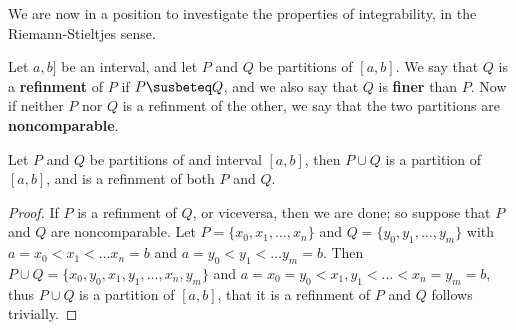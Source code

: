 We are now in a position to investigate the properties of integrability, in the
Riemann-Stieltjes sense.

\begin{definition}
    Let $a,b]$ be an interval, and let  $P$ and  $Q$ be partitions of  $[a,b]$.
    We say that  $Q$ is a \textbf{refinment} of $P$ if  $P \susbeteq Q$, and we
    also say that $Q$ is \textbf{finer} than  $P$. Now if neither  $P$ nor  $Q$
    is a refinment of the other, we say that the two partitions are
    \textbf{noncomparable}.
\end{definition}

\begin{lemma}\label{6.1.2}
    Let $P$ and  $Q$ be partitions of and interval $[a,b]$, then  $P \cup Q$ is
    a partition of  $[a,b]$, and is a refinment of both  $P$ and  $Q$.
\end{lemma}
\begin{proof}
    If $P$ is a refinment of  $Q$, or viceversa, then we are done; so suppose
    that  $P$ and  $Q$ are noncomparable. Let  $P=\{x_0,x_1, \dots, x_n\}$ and
    $Q=\{y_0,y_1, \dots, y_m\}$ with $a=x_0<x_1< \dots x_n=b$ and $a=y_0<y_1<
    \dots y_m=b$. Then $P \cup Q=\{x_0,y_0,x_1,y_1, \dots, x_n,y_m\}$ and
    $a=x_0=y_0 < x_1,y_1 < \dots <x_n=y_m=b$, thus $P \cup Q$ is a partition of
    $[a,b]$, that it is a refinment of  $P$ and  $Q$ follows trivially.
\end{proof}
